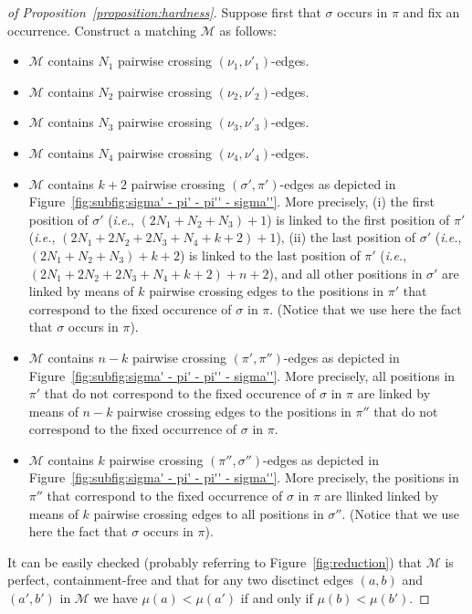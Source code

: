 \documentclass[a4paper]{llncs}
\begin{document}
\begin{proof}[of Proposition~\ref{proposition:hardness}]
  Suppose first that $\sigma$ occurs in $\pi$ and fix an occurrence.
  Construct a matching $\mathcal{M}$ as follows:
  \begin{itemize}
    \item $\mathcal{M}$ contains $N_1$ pairwise crossing
    $(\nu_1, \nu'_1)$-edges.
    \item $\mathcal{M}$ contains $N_2$ pairwise crossing
    $(\nu_2, \nu'_2)$-edges.
    \item $\mathcal{M}$ contains $N_3$ pairwise crossing
    $(\nu_3, \nu'_3)$-edges.
    \item $\mathcal{M}$ contains $N_4$ pairwise crossing
    $(\nu_4, \nu'_4)$-edges.
    \item $\mathcal{M}$ contains $k+2$ pairwise crossing
    $(\sigma', \pi')$-edges as depicted in
    Figure~\ref{fig:subfig:sigma' - pi' - pi'' - sigma''}.
    More precisely,
    (i) the first position of $\sigma'$
    (\emph{i.e.}, $(2N_1+N_2+N_3) + 1$) is linked
    to the first position of $\pi'$
    (\emph{i.e.}, $(2N_1 + 2N_2 + 2N_3 + N_4 + k + 2) + 1$),
    (ii) the last position of $\sigma'$
    (\emph{i.e.}, $(2N_1+N_2+N_3) + k+2$) is linked
    to the last position of $\pi'$
    (\emph{i.e.}, $(2N_1 + 2N_2 + 2N_3 + N_4 + k + 2) + n+2$),
    and all other positions in $\sigma'$ are linked by means of $k$ pairwise
    crossing edges to the positions in
    $\pi'$ that correspond to the fixed occurence of $\sigma$ in $\pi$.
    (Notice that we use here the fact that $\sigma$ occurs in $\pi$).
    \item $\mathcal{M}$ contains $n-k$ pairwise crossing
    $(\pi', \pi'')$-edges as depicted in
    Figure~\ref{fig:subfig:sigma' - pi' - pi'' - sigma''}.
    More precisely,
    all positions in $\pi'$ that do not correspond to the fixed occurence of
    $\sigma$ in $\pi$ are linked by means of $n-k$ pairwise crossing edges
    to the positions in $\pi''$ that do not correspond to the fixed
    occurrence of $\sigma$ in $\pi$.
    \item $\mathcal{M}$ contains $k$ pairwise crossing
    $(\pi'', \sigma'')$-edges as depicted in
    Figure~\ref{fig:subfig:sigma' - pi' - pi'' - sigma''}.
    More precisely, the positions in $\pi''$ that correspond to
    the fixed occurrence of $\sigma$ in $\pi$ are llinked
    linked by means of $k$ pairwise crossing edges to all positions in
    $\sigma''$.
    (Notice that we use here the fact that $\sigma$ occurs in $\pi$).
  \end{itemize}
  It can be easily checked (probably referring to Figure~\ref{fig:reduction}) that
  $\mathcal{M}$ is perfect, containment-free and that
  for any two disctinct edges
  $(a, b)$ and $(a', b')$ in $\mathcal{M}$
  we have $\mu(a) < \mu(a')$ if and only if $\mu(b) < \mu(b')$.



\end{proof}
\end{document}
